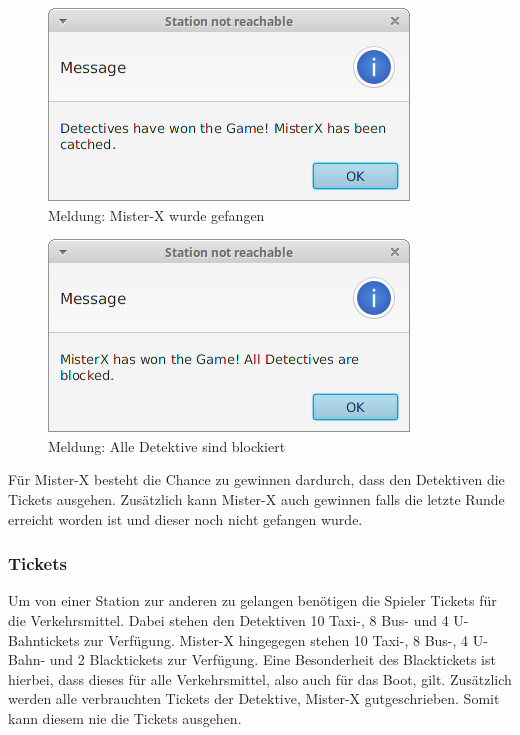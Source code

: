             \begin{figure}[H]
                \centering
                \includegraphics[scale=0.6]{img/benutzerhandbuch/won_catch.png}   
                \caption{Meldung: Mister-X wurde gefangen}
            \end{figure}
            \begin{figure}[H]
                \centering
                \includegraphics[scale=0.6]{img/benutzerhandbuch/won_blocked.png}   
                \caption{Meldung: Alle Detektive sind blockiert}
            \end{figure}
            Für Mister-X besteht die Chance zu gewinnen dardurch, dass den Detektiven die Tickets ausgehen.
            Zusätzlich kann Mister-X auch gewinnen falls die letzte Runde erreicht worden ist und dieser noch nicht gefangen wurde.
        \subsubsection{Tickets}
            Um von einer Station zur anderen zu gelangen benötigen die Spieler Tickets für die Verkehrsmittel.
            Dabei stehen den Detektiven 10 Taxi-, 8 Bus- und 4 U-Bahntickets zur Verfügung.
            Mister-X hingegegen stehen  10 Taxi-, 8 Bus-, 4 U-Bahn- und 2 Blacktickets zur Verfügung.
            Eine Besonderheit des Blacktickets ist hierbei, dass dieses für alle Verkehrsmittel, also auch für das Boot, gilt.
            Zusätzlich werden alle verbrauchten Tickets der Detektive, Mister-X gutgeschrieben.
            Somit kann diesem nie die Tickets ausgehen.
